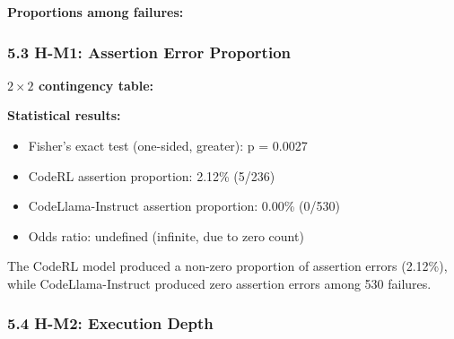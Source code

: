 \textbf{Proportions among failures:}

\begin{table}[htbp]
\centering
{}
\end{table}

\subsubsection{5.3 H-M1: Assertion Error Proportion}

\textbf{$2\times 2$ contingency table:}

\begin{table}[htbp]
\centering
{}
\end{table}

\textbf{Statistical results:}
\begin{itemize}
\item Fisher's exact test (one-sided, greater): p = 0.0027
\item CodeRL assertion proportion: 2.12\% (5/236)
\item CodeLlama-Instruct assertion proportion: 0.00\% (0/530)
\item Odds ratio: undefined (infinite, due to zero count)
\end{itemize}

The CodeRL model produced a non-zero proportion of assertion errors (2.12\%), while CodeLlama-Instruct produced zero assertion errors among 530 failures.

\subsubsection{5.4 H-M2: Execution Depth}

